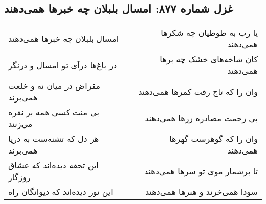 \begin{center}
\section*{غزل شماره ۸۷۷: امسال بلبلان چه خبرها همی‌دهند}
\label{sec:0877}
\begin{longtable}{l p{0.5cm} r}
امسال بلبلان چه خبرها همی‌دهند
&&
یا رب به طوطیان چه شکرها همی‌دهند
\\
در باغ‌ها درآی تو امسال و درنگر
&&
کان شاخه‌های خشک چه برها همی‌دهند
\\
مقراض در میان نه و خلعت همی‌برند
&&
وان را که تاج رفت کمرها همی‌دهند
\\
بی منت کسی همه بر نقره می‌زنند
&&
بی زحمت مصادره زرها همی‌دهند
\\
هر دل که تشنه‌ست به دریا همی‌برند
&&
وان را که گوهرست گهرها همی‌دهند
\\
این تحفه دیده‌اند که عشاق روزگار
&&
تا برشمار موی تو سرها همی‌دهند
\\
این نور دیده‌اند که دیوانگان راه
&&
سودا همی‌خرند و هنرها همی‌دهند
\\
\end{longtable}
\end{center}

